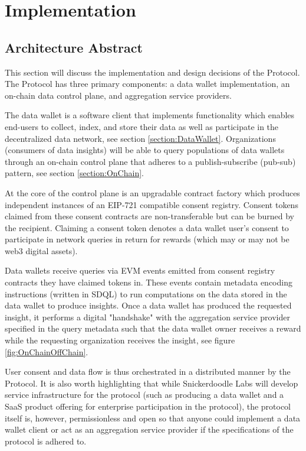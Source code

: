 \section{Implementation}
\label{section:Implementation}
\subsection{Architecture Abstract}
\label{section:Architecture}

This section will discuss the implementation and design decisions of the Protocol. The Protocol has three primary 
components: a data wallet implementation, an on-chain data control plane, and aggregation service providers.

The data wallet is a software client that implements functionality which enables end-users to collect, index, and store their data as well as participate 
in the decentralized data network, see section \ref{section:DataWallet}. Organizations (consumers of data insights) will be able 
to query populations of data wallets through an on-chain control plane that adheres to a publish-subscribe (pub-sub) pattern, see section \ref{section:OnChain}. 

At the core of the control plane is an upgradable contract factory which produces independent instances of an EIP-721 compatible consent registry. 
Consent tokens claimed from these consent contracts are non-transferable but can be burned by the recipient. Claiming a consent token denotes a data 
wallet user's consent to participate in network queries in return for rewards (which may or may not be web3 digital assets). 

Data wallets receive queries via EVM events emitted from consent registry contracts they have claimed tokens in. These events contain metadata encoding
instructions (written in SDQL) to run computations on the data stored in the data wallet to produce insights. Once a data wallet has produced
the requested insight, it performs a digital "handshake" with the aggregation service provider specified in the query metadata such that the 
data wallet owner receives a reward while the requesting organization receives the insight, see figure \ref{fig:OnChainOffChain}. 

User consent and data flow is thus orchestrated in a distributed manner by the Protocol. It is also worth highlighting that while 
Snickerdoodle Labs will develop service infrastructure for the protocol (such as producing a data wallet and a SaaS product offering 
for enterprise participation in the protocol), the protocol itself is, however, permissionless and open so that anyone could implement a 
data wallet client or act as an aggregation service provider if the specifications of the protocol is adhered to. 

